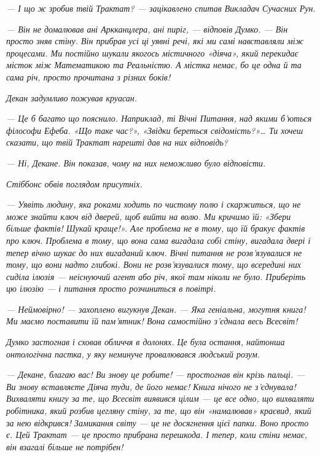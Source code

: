 \documentclass[12pt, a4paper, openany]{book}
\begin{document}
\begin{terrybox}
\textit{--- І що ж зробив твій Трактат? --- зацікавлено спитав Викладач Сучасних Рун.}

\textit{--- Він не домалював ані Аркканцлера, ані пиріг, --- відповів Думко. --- Він просто зняв стіну. Він прибрав усі ці уявні речі, які ми самі навставляли між процесами. Ми постійно шукали якогось містичного «діяча», який перекидає місток між Математикою та Реальністю. А містка немає, бо це одна й та сама річ, просто прочитана з різних боків!}

\textit{Декан задумливо пожував круасан.}

\textit{--- Це б багато що пояснило. Наприклад, ті Вічні Питання, над якими б'ються філософи Ефеба. «Що таке час?», «Звідки береться свідомість?»\ldots{} Ти хочеш сказати, що твій Трактат нарешті дав на них відповідь?}

\textit{--- Ні, Декане. Він показав, чому на них \emph{неможливо} було відповісти.}

\textit{Стіббонс обвів поглядом присутніх.}

\textit{--- Уявіть людину, яка роками ходить по чистому полю і скаржиться, що не може знайти ключ від дверей, щоб вийти на волю. Ми кричимо їй: «Збери більше фактів! Шукай краще!». Але проблема не в тому, що їй бракує фактів про ключ. Проблема в тому, що вона сама вигадала собі стіну, вигадала двері і тепер вічно шукає до них вигаданий ключ. Вічні питання не розв'язувалися не тому, що вони надто глибокі. Вони не розв'язувалися тому, що всередині них сиділа ілюзія --- неіснуючий агент або річ, якої там ніколи не було. Приберіть цю ілюзію --- і питання просто розчиниться в повітрі.}

\textit{--- Неймовірно! --- захоплено вигукнув Декан. --- Яка геніальна, могутня книга! Ми маємо поставити їй пам'ятник! Вона самостійно з'єднала весь Всесвіт!}

\textit{Думко застогнав і сховав обличчя в долонях. Це була остання, найтонша онтологічна пастка, у яку неминуче провалювався людський розум.}

\textit{--- Декане, благаю вас! Ви знову це робите! --- простогнав він крізь пальці. --- Ви знову вставляєте Діяча туди, де його немає! Книга нічого не з'єднувала! Вихваляти книгу за те, що Всесвіт виявився цілим --- це все одно, що вихваляти робітника, який розбив цегляну стіну, за те, що він «намалював» краєвид, який за нею відкрився! Замикання світу --- це не досягнення цієї папки. Воно просто \emph{є}. Цей Трактат --- це просто прибрана перешкода. І тепер, коли стіни немає, він взагалі більше не потрібен!}


\end{terrybox}
\end{document}
